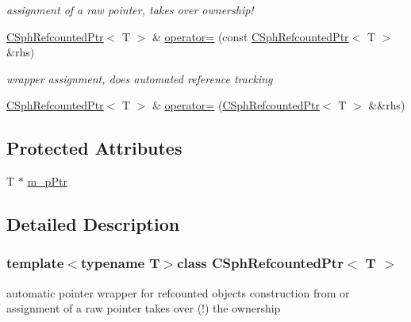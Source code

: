 \begin{DoxyCompactItemize}
\begin{DoxyCompactList}\small\item\em assignment of a raw pointer, takes over ownership! \end{DoxyCompactList}\item 
\hyperlink{classCSphRefcountedPtr}{C\-Sph\-Refcounted\-Ptr}$<$ T $>$ \& \hyperlink{classCSphRefcountedPtr_ac804e476639c3cc652bf2ba3498f049e}{operator=} (const \hyperlink{classCSphRefcountedPtr}{C\-Sph\-Refcounted\-Ptr}$<$ T $>$ \&rhs)
\begin{DoxyCompactList}\small\item\em wrapper assignment, does automated reference tracking \end{DoxyCompactList}\item 
\hyperlink{classCSphRefcountedPtr}{C\-Sph\-Refcounted\-Ptr}$<$ T $>$ \& \hyperlink{classCSphRefcountedPtr_a5b57aaea811bdf20b0fc48775ac2fda1}{operator=} (\hyperlink{classCSphRefcountedPtr}{C\-Sph\-Refcounted\-Ptr}$<$ T $>$ \&\&rhs)
\end{DoxyCompactItemize}
\subsection*{Protected Attributes}
\begin{DoxyCompactItemize}
\item 
T $\ast$ \hyperlink{classCSphRefcountedPtr_ac8a06f97ff0fe3545c736650dedb4b69}{m\-\_\-p\-Ptr}
\end{DoxyCompactItemize}


\subsection{Detailed Description}
\subsubsection*{template$<$typename T$>$class C\-Sph\-Refcounted\-Ptr$<$ T $>$}

automatic pointer wrapper for refcounted objects construction from or assignment of a raw pointer takes over (!) the ownership 

